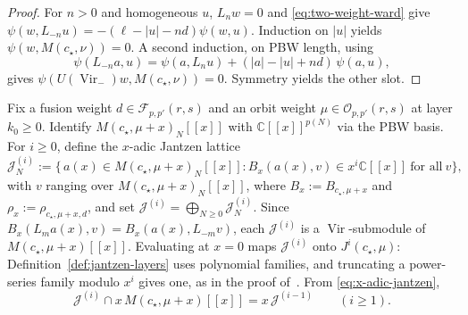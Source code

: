 \documentclass[twoside,10pt]{article}
\numberwithin{equation}{section}
\theoremstyle{slbody}
\theoremstyle{definition}
\theoremstyle{remark}
\newcommand{\Vir}{\operatorname{Vir}}
\begin{document}
\begin{proof}
For \(n>0\) and homogeneous \(u\), \(L_nw=0\) and
\eqref{eq:two-weight-ward} give \(\psi(w,L_{-n}u)=-(\ell-|u|-nd)\psi(w,u)\).
Induction on \(|u|\) yields \(\psi(w,M(c_\star,\nu))=0\).  A second induction,
on PBW length, using
\[
 \psi(L_{-n}a,u)=\psi(a,L_nu)+(|a|-|u|+nd)\,\psi(a,u),
\]
gives \(\psi(U(\Vir_-)w,M(c_\star,\nu))=0\).  Symmetry yields the other slot.
\end{proof}

Fix a fusion weight \(d\in\mathcal{F}_{p,p'}(r,s)\) and an orbit weight
\(\mu\in\mathcal{O}_{p,p'}(r,s)\) at layer \(k_0\geq0\).  Identify \(M(c_\star,\mu+x)_N[[x]]\) with
\(\mathbb{C}[[x]]^{p(N)}\) via the PBW basis.  For \(i\geq0\), define the
\(x\)-adic Jantzen lattice
\begin{equation}\label{eq:x-adic-jantzen}
 \mathcal{J}^{(i)}_N
 :=\bigl\{\,a(x)\in M(c_\star,\mu+x)_N[[x]]
   : B_x(a(x),v)\in x^i\mathbb{C}[[x]]\ \text{for all}\ v\bigr\},
\end{equation}
with \(v\) ranging over \(M(c_\star,\mu+x)_N[[x]]\),
where \(B_x:=B_{c_\star,\mu+x}\) and \(\rho_x:=\rho_{c_\star,\mu+x,d}\), and
set \(\mathcal{J}^{(i)}=\bigoplus_{N\geq0}\mathcal{J}^{(i)}_N\).  Since
\(B_x(L_ma(x),v)=B_x(a(x),L_{-m}v)\), each \(\mathcal{J}^{(i)}\) is a
\(\Vir\)-submodule of \(M(c_\star,\mu+x)[[x]]\).  Evaluating at \(x=0\) maps
\(\mathcal{J}^{(i)}\) onto \(J^i(c_\star,\mu)\): Definition~\ref{def:jantzen-layers}
uses polynomial families, and truncating a power-series family modulo \(x^i\)
gives one, as in the proof of~\cite[Lemma~5.3]{PolzerColliding2026}.  From
\eqref{eq:x-adic-jantzen},
\begin{equation}\label{eq:x-shift-lattice}
 \mathcal{J}^{(i)}\cap x\,M(c_\star,\mu+x)[[x]] = x\,\mathcal{J}^{(i-1)}
 \qquad (i\geq1).
\end{equation}
\end{document}
